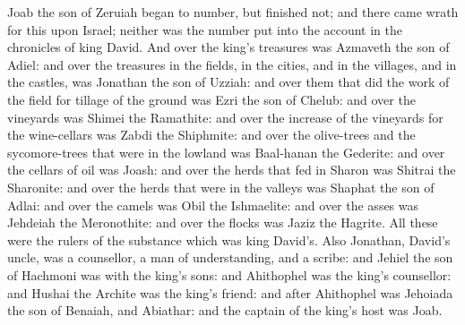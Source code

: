 Joab the son of Zeruiah began to number, but finished not; and there came wrath for this upon Israel; neither was the number put into the account in the chronicles of king David.  And over the king’s treasures was Azmaveth the son of Adiel: and over the treasures in the fields, in the cities, and in the villages, and in the castles, was Jonathan the son of Uzziah: and over them that did the work of the field for tillage of the ground was Ezri the son of Chelub: and over the vineyards was Shimei the Ramathite: and over the increase of the vineyards for the wine-cellars was Zabdi the Shiphmite: and over the olive-trees and the sycomore-trees that were in the lowland was Baal-hanan the Gederite: and over the cellars of oil was Joash: and over the herds that fed in Sharon was Shitrai the Sharonite: and over the herds that were in the valleys was Shaphat the son of Adlai: and over the camels was Obil the Ishmaelite: and over the asses was Jehdeiah the Meronothite: and over the flocks was Jaziz the Hagrite. All these were the rulers of the substance which was king David’s.  Also Jonathan, David’s uncle, was a counsellor, a man of understanding, and a scribe: and Jehiel the son of Hachmoni was with the king’s sons: and Ahithophel was the king’s counsellor: and Hushai the Archite was the king’s friend: and after Ahithophel was Jehoiada the son of Benaiah, and Abiathar: and the captain of the king’s host was Joab. 

